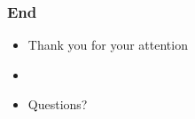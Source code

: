 \documentclass[xcolor=table]{beamer}
\begin{document}

\begin{frame}
\frametitle{End}

\begin{itemize}
\item Thank you for your attention
\item[]
\item Questions?
\end{itemize}

\end{frame}



 
\end{document}

